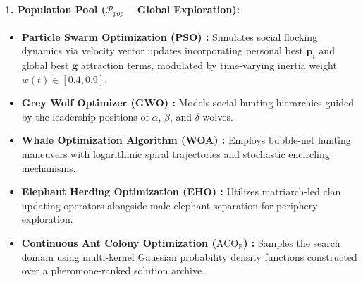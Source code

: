 \paragraph{1. Population Pool ($\mathcal{P}_{pop}$ -- Global Exploration):}
\begin{itemize}
    \item \textbf{Particle Swarm Optimization (PSO) \cite{kennedy1995particle}:} Simulates social flocking dynamics via velocity vector updates incorporating personal best $\mathbf{p}_i$ and global best $\mathbf{g}$ attraction terms, modulated by time-varying inertia weight $w(t) \in [0.4, 0.9]$.
    \item \textbf{Grey Wolf Optimizer (GWO) \cite{mirjalili2014grey}:} Models social hunting hierarchies guided by the leadership positions of $\alpha$, $\beta$, and $\delta$ wolves.
    \item \textbf{Whale Optimization Algorithm (WOA) \cite{mirjalili2016whale}:} Employs bubble-net hunting maneuvers with logarithmic spiral trajectories and stochastic encircling mechanisms.
    \item \textbf{Elephant Herding Optimization (EHO) \cite{wang2015elephant}:} Utilizes matriarch-led clan updating operators alongside male elephant separation for periphery exploration.
    \item \textbf{Continuous Ant Colony Optimization ($\text{ACO}_{\mathbb{R}}$) \cite{dorigo2004ant}:} Samples the search domain using multi-kernel Gaussian probability density functions constructed over a pheromone-ranked solution archive.
\end{itemize}

